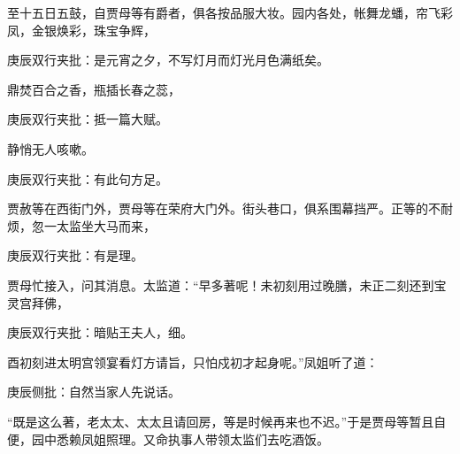 \begin{parag}
    至十五日五鼓，自贾母等有爵者，俱各按品服大妆。园内各处，帐舞龙蟠，帘飞彩凤，金银焕彩，珠宝争辉，\begin{note}庚辰双行夹批：是元宵之夕，不写灯月而灯光月色满纸矣。\end{note}鼎焚百合之香，瓶插长春之蕊，\begin{note}庚辰双行夹批：抵一篇大赋。\end{note}静悄无人咳嗽。\begin{note}庚辰双行夹批：有此句方足。\end{note}贾赦等在西街门外，贾母等在荣府大门外。街头巷口，俱系围幕挡严。正等的不耐烦，忽一太监坐大马而来，\begin{note}庚辰双行夹批：有是理。\end{note}贾母忙接入，问其消息。太监道：“早多著呢！未初刻用过晚膳，未正二刻还到宝灵宫拜佛，\begin{note}庚辰双行夹批：暗贴王夫人，细。\end{note}酉初刻进太明宫领宴看灯方请旨，只怕戍初才起身呢。”凤姐听了道：\begin{note}庚辰侧批：自然当家人先说话。\end{note}“既是这么著，老太太、太太且请回房，等是时候再来也不迟。”于是贾母等暂且自便，园中悉赖凤姐照理。又命执事人带领太监们去吃酒饭。
\end{parag}


